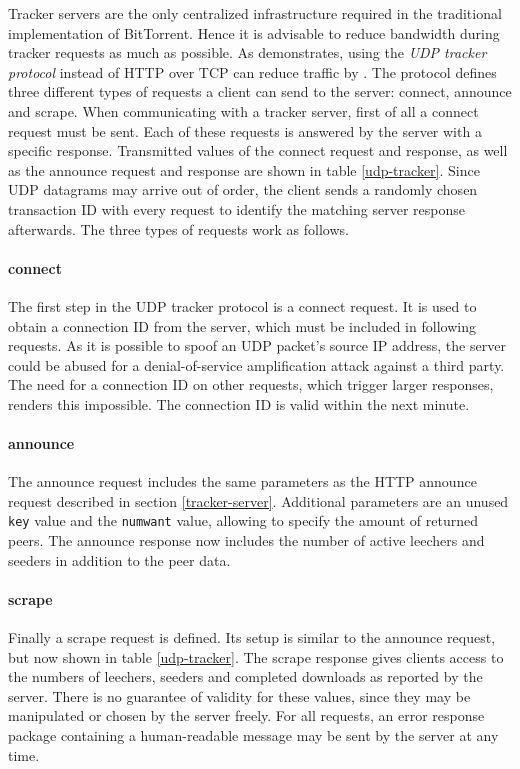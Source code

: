\documentclass[10pt, a4paper, twoside=false, headsepline]{scrbook}
\renewcommand{\_}{\origunderscore\allowbreak}
\begin{document}
Tracker servers are the only centralized infrastructure required in the traditional implementation of BitTorrent. Hence it is advisable to reduce bandwidth during tracker requests as much as possible. As \cite{bep15} demonstrates, using the \emph{UDP tracker protocol} instead of HTTP over TCP can reduce traffic by . The protocol defines three different types of requests a client can send to the server: connect, announce and scrape. When communicating with a tracker server, first of all a connect request must be sent. Each of these requests is answered by the server with a specific response. Transmitted values of the connect request and response, as well as the announce request and response are shown in table \ref{udp-tracker}. Since UDP datagrams may arrive out of order, the client sends a randomly chosen transaction ID with every request to identify the matching server response afterwards. The three types of requests work as follows.

\paragraph{connect}
The first step in the UDP tracker protocol is a connect request. It is used to obtain a connection ID from the server, which must be included in following requests. As it is possible to spoof an UDP packet's source IP address, the server could be abused for a denial-of-service amplification attack against a third party. The need for a connection ID on other requests, which trigger larger responses, renders this impossible. The connection ID is valid within the next minute.

\paragraph{announce}
The announce request includes the same parameters as the HTTP announce request described in section \ref{tracker-server}. Additional parameters are an unused \texttt{key} value and the \texttt{num\_want} value, allowing to specify the amount of returned peers. The announce response now includes the number of active leechers and seeders in addition to the peer data.

\paragraph{scrape}
Finally a scrape request is defined. Its setup is similar to the announce request, but now shown in table \ref{udp-tracker}. The scrape response gives clients access to the numbers of leechers, seeders and completed downloads as reported by the server. There is no guarantee of validity for these values, since they may be manipulated or chosen by the server freely. For all requests, an error response package containing a human-readable message may be sent by the server at any time.
\end{document}
